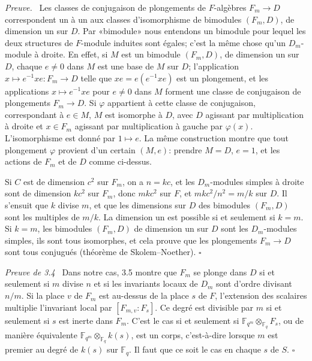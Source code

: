 \documentclass[10pt]{article}
\newcommand{\Fq}{\mathbb F_q}
\theoremstyle{deligne}
\newenvironment{proofdel}[1][Preuve.]{\textit{#1}\ }{\hfill$\square$}
\begin{document}
\begin{proofdel}
Les classes de conjugaison de plongements de $F$-algèbres $F_m\to D$ correspondent un à un aux classes d'isomorphisme de bimodules $(F_m,D)$, de dimension un sur $D$. Par «bimodule» nous entendons un bimodule pour lequel les deux structures de $F$-module induites sont égales; c'est la même chose qu'un $D_m$-module à droite. En effet, si $M$ est un bimodule $(F_m,D)$, de dimension un sur $D$, chaque $e\ne0$ dans $M$ est une base de $M$ sur $D$; l'application $x\mapsto e^{-1}xe:F_m\to D$ telle que $xe=e(e^{-1}xe)$ est un plongement, et les applications $x\mapsto e^{-1}xe$ pour $e\ne0$ dans $M$ forment une classe de conjugaison de plongements $F_m\to D$. Si $\varphi$ appartient à cette classe de conjugaison, correspondant à $e\in M$, $M$ est isomorphe à $D$, avec $D$ agissant par multiplication à droite et $x\in F_m$ agissant par multiplication à gauche par $\varphi(x)$. L'isomorphisme est donné par $1\mapsto e$. La même construction montre que tout plongement $\varphi$ provient d'un certain $(M,e)$: prendre $M=D$, $e=1$, et les actions de $F_m$ et de $D$ comme ci-dessus.

Si $C$ est de dimension $c^2$ sur $F_m$, on a $n=kc$, et les $D_m$-modules simples à droite sont de dimension $kc^2$ sur $F_m$, donc $mkc^2$ sur $F$, et $mkc^2/n^2=m/k$ sur $D$. Il s'ensuit que $k$ divise $m$, et que les dimensions sur $D$ des bimodules $(F_m,D)$ sont les multiples de $m/k$. La dimension un est possible si et seulement si $k=m$. Si $k=m$, les bimodules $(F_m,D)$ de dimension un sur $D$ sont les $D_m$-modules simples, ils sont tous isomorphes, et cela prouve que les plongements $F_m\to D$ sont tous conjugués (théorème de Skolem--Noether).
\end{proofdel}

\begin{proofdel}[Preuve de 3.4]
Dans notre cas, 3.5 montre que $F_m$ se plonge dans $D$ si et seulement si $m$ divise $n$ et si les invariants locaux de $D_m$ sont d'ordre divisant $n/m$. Si la place $v$ de $F_m$ est au-dessus de la place $s$ de $F$, l'extension des scalaires multiplie l'invariant local par $[F_{m,v}:F_s]$. Ce degré est divisible par $m$ si et seulement si $s$ est inerte dans $F_m$. C'est le cas si et seulement si $\mathbb F_{q^m}\otimes_{\Fq}F_s$, ou de manière équivalente $\mathbb F_{q^m}\otimes_{\Fq}k(s)$, est un corps, c'est-à-dire lorsque $m$ est premier au degré de $k(s)$ sur $\Fq$. Il faut que ce soit le cas en chaque $s$ de $S$.
\end{proofdel}
\end{document}

